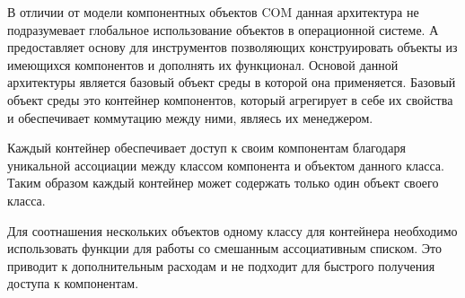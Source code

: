 В отличии от модели компонентных объектов C\-O\-M данная архитектура не подразумевает глобальное использование объектов в операционной системе. А предоставляет основу для инструментов позволяющих конструировать объекты из имеющихся компонентов и дополнять их функционал. Основой данной архитектуры является базовый объект среды в которой она применяется. Базовый объект среды это контейнер компонентов, который агрегирует в себе их свойства и обеспечивает коммутацию между ними, являесь их менеджером.

Каждый контейнер обеспечивает доступ к своим компонентам благодаря уникальной ассоциации между классом компонента и объектом данного класса. Таким образом каждый контейнер может содержать только один объект своего класса.

Для соотнашения нескольких объектов одному классу для контейнера необходимо использовать функции для работы со смешанным ассоциативным списком. Это приводит к дополнительным расходам и не подходит для быстрого получения доступа к компонентам. 